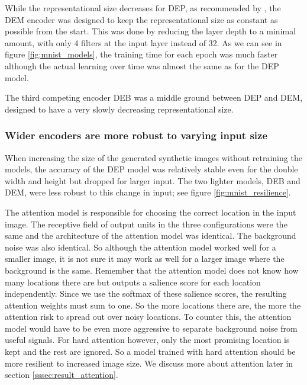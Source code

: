 While the representational size decreases for DEP, as recommended by \textcite{InceptionV3}, the DEM encoder was designed to keep the representational size as constant as possible from the start.
This was done by reducing the layer depth to a minimal amount, with only 4 filters at the input layer instead of 32.
As we can see in figure \ref{fig:mnist_models}, the training time for each epoch was much faster although the actual learning over time was almost the same as for the DEP model.

The third competing encoder DEB was a middle ground between DEP and DEM, designed to have a very slowly decreasing representational size.

\subsubsection{Wider encoders are more robust to varying input size}



When increasing the size of the generated synthetic images without retraining the models, the accuracy of the DEP model was relatively stable even for the double width and height but dropped for larger input. The two lighter models, DEB and DEM, were less robust to this change in input; see figure \ref{fig:mnist_resilience}.

The attention model is responsible for choosing the correct location in the input image. The receptive field of output units in the three configurations were the same and the architecture of the attention model was identical. The background noise was also identical. So although the attention model worked well for a smaller image, it is not sure it may work as well for a larger image where the background is the same.
Remember that the attention model does not know how many locations there are but outputs a salience score for each location independently. Since we use the softmax of these salience scores, the resulting attention weights must sum to one. So the more locations there are, the more the attention risk to spread out over noisy locations. To counter this, the attention model would have to be even more aggressive to separate background noise from useful signals. For hard attention however, only the most promising location is kept and the rest are ignored. So a model trained with hard attention should be more resilient to increased image size. We discuss more about attention later in section \ref{sssec:result_attention}.

